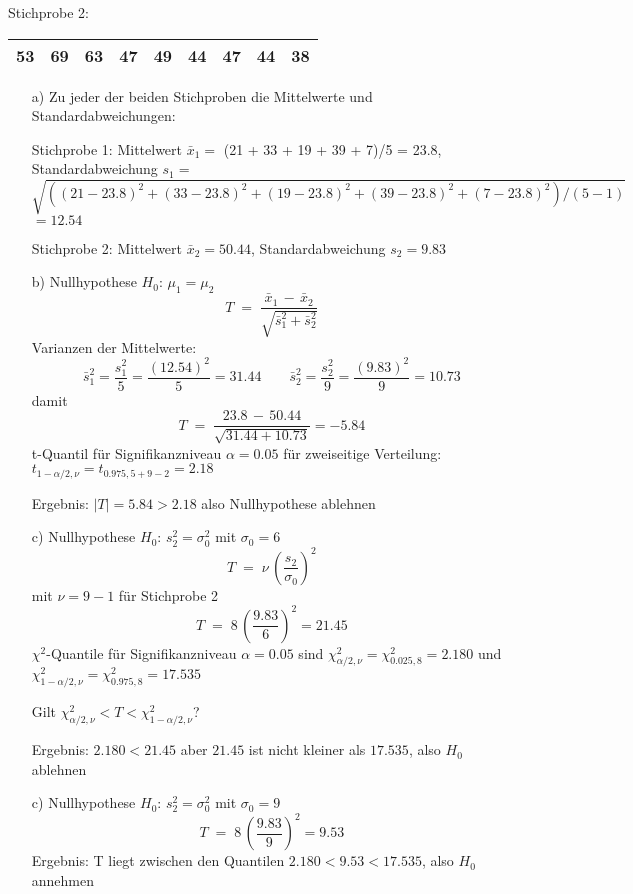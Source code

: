 Stichprobe 2:

\begin{tabular}{|c|c|c|c|c|c|c|c|c|}
\hline
53 & 69 & 63 & 47 & 49 & 44 & 47 & 44 & 38\\
\hline
\end{tabular}

\begin{itemize}
\item[a)] Zu jeder der beiden Stichproben die Mittelwerte und Standardabweichungen:

Stichprobe 1: Mittelwert $\bar x_1 = $ (21 + 33 + 19 + 39 + 7)/5 = 23.8,
Standardabweichung $s_1 = $ $\sqrt{((21-23.8)^2 + (33-23.8)^2 + (19-23.8)^2 + (39-23.8)^2 + (7-23.8)^2)/(5-1)}$ $= 12.54$

Stichprobe 2: Mittelwert $\bar x_2 = 50.44$, Standardabweichung $s_2 = 9.83$

\item[b)] Nullhypothese $H_0$: $\mu_1 = \mu_2$
$$
T \; = \; \frac{\bar x_1 \, - \, \bar x_2}{\sqrt{\bar s_1^2 + \bar s_2^2}}
$$
Varianzen der Mittelwerte:
$$
\bar s_1^2 = \frac{s_1^2}{5} = \frac{(12.54)^2}{5} = 31.44
\qquad
\bar s_2^2 = \frac{s_2^2}{9} = \frac{(9.83)^2}{9} = 10.73
$$
damit
$$
T \; = \; \frac{23.8 \, - \, 50.44}{\sqrt{31.44 + 10.73}} = -5.84
$$
t-Quantil für Signifikanzniveau $\alpha = 0.05$ für zweiseitige Verteilung:
$t_{1-\alpha/2,\nu} = t_{0.975,5+9-2} = 2.18$

Ergebnis: $|T| = 5.84 > 2.18$ also Nullhypothese ablehnen

\item[c)] Nullhypothese $H_0$: $s_2^2 = \sigma_0^2$ mit $\sigma_0 = 6$
$$
T \; = \; \nu \, \left( \frac{s_2}{\sigma_0} \right)^2
$$
mit $\nu = 9-1$ für Stichprobe 2
$$
T \; = \; 8 \, \left( \frac{9.83}{6} \right)^2 = 21.45
$$
$\chi^2$-Quantile für Signifikanzniveau $\alpha = 0.05$ sind
$\chi^2_{\alpha/2,\nu} = \chi^2_{0.025,8} = 2.180$ und
$\chi^2_{1-\alpha/2,\nu} = \chi^2_{0.975,8} = 17.535$

Gilt $\chi^2_{\alpha/2,\nu} < T < \chi^2_{1-\alpha/2,\nu}$?

Ergebnis: $2.180 < 21.45$ aber $21.45$ ist nicht kleiner als $17.535$, also $H_0$ ablehnen

\item[c)] Nullhypothese $H_0$: $s_2^2 = \sigma_0^2$ mit $\sigma_0 = 9$
$$
T \; = \; 8 \, \left( \frac{9.83}{9} \right)^2 = 9.53
$$
Ergebnis:
T liegt zwischen den Quantilen $2.180 < 9.53 < 17.535$, also $H_0$ annehmen
\end{itemize}


